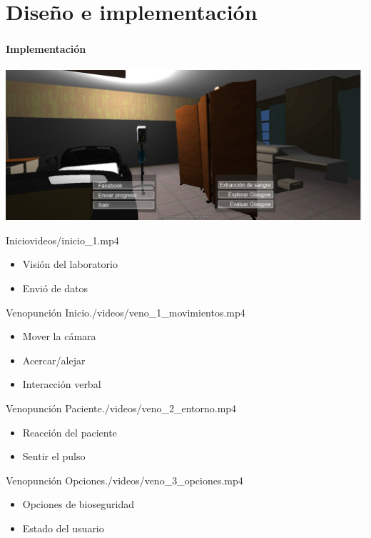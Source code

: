 \section{Diseño e implementación}
\setcounter{sectiontotal}{1}

\iflinux
    
\else
    
\fi

\begin{frame}
\frametitle{\pagetitle}
\framesubtitle{Implementación}
    \includegraphics[width=\textwidth]{../solucion/images/pantalla_inicio.jpg}%
\end{frame}

\begin{step}{Inicio}{videos/inicio_1.mp4}
\begin{itemize}
    \item Visión del laboratorio
    \item Envió de datos
\end{itemize}
\end{step}

\begin{step}{Venopunción Inicio}{./videos/veno_1_movimientos.mp4}
\begin{itemize}
    \item Mover la cámara
    \item Acercar/alejar
    \item Interacción verbal
\end{itemize}
\end{step}

\begin{step}{Venopunción Paciente}{./videos/veno_2_entorno.mp4}
\begin{itemize}
    \item Reacción del paciente
    \item Sentir el pulso
\end{itemize}
\end{step}

\begin{step}{Venopunción Opciones}{./videos/veno_3_opciones.mp4}
\begin{itemize}
    \item Opciones de bioseguridad
    \item Estado del usuario
\end{itemize}
\end{step}

